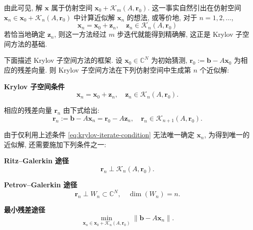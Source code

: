 由此可见, 解 $\bm x$ 属于仿射空间 $\bm x_0+\mathcal K_m(A,\bm r_0)$. 这一事实自然引出在仿射空间 $\bm x_n\in\bm x_0+\mathcal K_n(A,\bm r_0)$ 中计算近似解 $\bm x_n$ 的想法, 或等价地, 对于 $n=1,2,\ldots$,
\[
\bm x_n=\bm x_0+\bm z_n,\quad\bm z_n\in\mathcal K_n(A,\bm r_0)
\]
若恰当地确定 $\bm z_n$, 则这一方法经过 $m$ 步迭代就能得到精确解, 这正是 Krylov 子空间方法的基础.

下面描述 Krylov 子空间方法的框架. 设 $\bm x_0\in\mathbb C^N$ 为初始猜测, $\bm r_0:=\bm b-A\bm x_0$ 为相应的残差向量. 则 Krylov 子空间方法在下列仿射空间中生成第 $n$ 个近似解:

\noindent\textbf{Krylov 子空间条件}
\begin{equation}\label{eq:krylov-iterate-condition}
\bm x_n=\bm x_0+\bm z_n,\quad\bm z_n\in\mathcal K_n(A,\bm r_0).
\end{equation}

相应的残差向量 $\bm r_n$ 由下式给出:
\begin{equation}\label{eq:krylov-residual}
\bm r_n:=\bm b-A\bm x_n=\bm r_0-A\bm z_n,\quad\bm r_n\in\mathcal K_{n+1}(A,\bm r_0).
\end{equation}

由于仅利用上述条件 \eqref{eq:krylov-iterate-condition} 无法唯一确定 $\bm x_n$, 为得到唯一的近似解, 还需要施加下列条件之一:

\noindent\textbf{Ritz--Galerkin 途径}
\begin{equation}\label{eq:ritz-galerkin-orthogonality}
\bm r_n\perp\mathcal K_n(A,\bm r_0).
\end{equation}

\noindent\textbf{Petrov--Galerkin 途径}
\begin{equation}\label{eq:petrov-galerkin-orthogonality}
\bm r_n\perp W_n\subset\mathbb C^N,\quad\dim(W_n)=n.
\end{equation}

\noindent\textbf{最小残差途径}
\begin{equation}\label{eq:minimal-residual-problem}
\min_{\bm x_n\in\bm x_0+\mathcal K_n(A,\bm r_0)}\|\bm b-A\bm x_n\|.
\end{equation}

